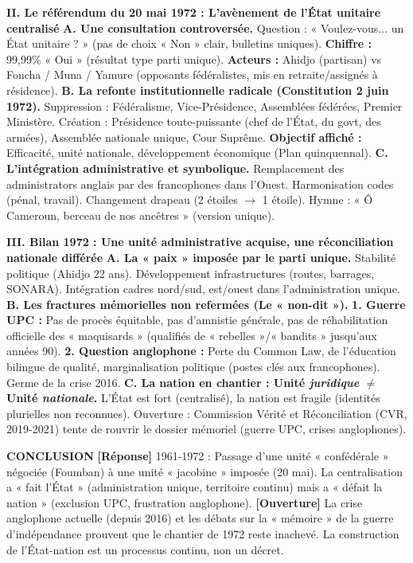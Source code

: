 \documentclass[11pt]{article}
\newcommand{\cle}[1]{{\popxbold\color{popdark}#1}}
\begin{document}
\begin{exoresolu}
\textbf{II. Le référendum du 20 mai 1972 : L'avènement de l'État unitaire centralisé}
\textbf{A. Une consultation controversée.}
Question : « Voulez-vous... un État unitaire ? » (pas de choix « Non » clair, bulletins uniques). \textbf{Chiffre :} 99,99\% « Oui » (résultat type parti unique). \textbf{Acteurs :} Ahidjo (partisan) vs Foncha / Muna / Yamure (opposants fédéralistes, mis en retraite/assignés à résidence).
\textbf{B. La refonte institutionnelle radicale (Constitution 2 juin 1972).}
Suppression : Fédéralisme, Vice-Présidence, Assemblées fédérées, Premier Ministère. Création : Présidence toute-puissante (chef de l'État, du govt, des armées), Assemblée nationale unique, Cour Suprême. \textbf{Objectif affiché :} Efficacité, unité nationale, développement économique (Plan quinquennal).
\textbf{C. L'intégration administrative et symbolique.}
Remplacement des administrators anglais par des francophones dans l'Ouest. Harmonisation codes (pénal, travail). Changement drapeau (2 étoiles $\rightarrow$ 1 étoile). Hymne : « Ô Cameroun, berceau de nos ancêtres » (version unique).

\textbf{III. Bilan 1972 : Une unité administrative acquise, une réconciliation nationale différée}
\textbf{A. La « paix » imposée par le parti unique.}
Stabilité politique (Ahidjo 22 ans). Développement infrastructures (routes, barrages, SONARA). Intégration cadres nord/sud, est/ouest dans l'administration unique.
\textbf{B. Les fractures mémorielles non refermées (Le « non-dit »).}
\textbf{1. Guerre UPC :} Pas de procès équitable, pas d'amnistie générale, pas de réhabilitation officielle des « maquisards » (qualifiés de « rebelles »/« bandits » jusqu'aux années 90). \textbf{2. Question anglophone :} Perte du \cle{Common Law}, de l'éducation bilingue de qualité, marginalisation politique (postes clés aux francophones). Germe de la crise 2016.
\textbf{C. La nation en chantier : Unité \emph{juridique} $\neq$ Unité \emph{nationale}.}
L'État est fort (centralisé), la nation est fragile (identités plurielles non reconnues). Ouverture : Commission Vérité et Réconciliation (CVR, 2019-2021) tente de rouvrir le dossier mémoriel (guerre UPC, crises anglophones).

\textbf{CONCLUSION}
\textbf{[Réponse]} 1961-1972 : Passage d'une unité « confédérale » négociée (Foumban) à une unité « jacobine » imposée (20 mai). La centralisation a « fait l'État » (administration unique, territoire continu) mais a « défait la nation » (exclusion UPC, frustration anglophone).
\textbf{[Ouverture]} La crise anglophone actuelle (depuis 2016) et les débats sur la « mémoire » de la guerre d'indépendance prouvent que le chantier de 1972 reste inachevé. La construction de l'État-nation est un processus continu, non un décret.
\end{exoresolu}
\end{document}
